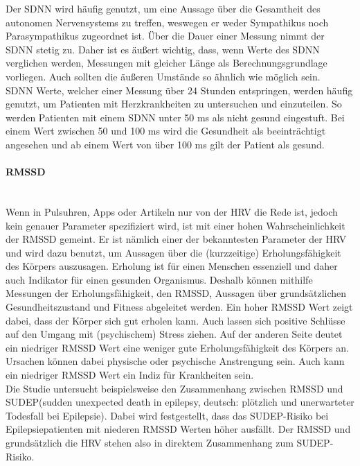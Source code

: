 Der \acs{SDNN} wird häufig genutzt, um eine Aussage über die Gesamtheit des autonomen Nervensystems zu treffen, weswegen er weder Sympathikus noch Parasympathikus zugeordnet ist.\cite[S.22]{babilon}  Über die Dauer einer Messung nimmt der \acs{SDNN} stetig zu. Daher ist es äußert wichtig, dass, wenn Werte des \acs{SDNN} verglichen werden, Messungen mit gleicher Länge als Berechnungsgrundlage vorliegen. Auch sollten die äußeren Umstände so ähnlich wie möglich sein.\cite{zeit}\\
\acs{SDNN} Werte, welcher einer Messung über 24 Stunden entspringen, werden häufig genutzt, um Patienten mit Herzkrankheiten zu untersuchen und einzuteilen. So werden Patienten mit einem \acs{SDNN} unter 50 ms als nicht gesund eingestuft. Bei einem Wert zwischen 50 und 100 ms wird die Gesundheit als beeinträchtigt angesehen und ab einem Wert von über 100 ms gilt der Patient als gesund. \cite[S.4]{med}  

\paragraph{\ac{RMSSD}}\mbox{} \\
Wenn in Pulsuhren, Apps oder Artikeln nur von der \acs{HRV} die Rede ist, jedoch kein genauer Parameter spezifiziert wird, ist mit einer hohen Wahrscheinlichkeit der \acs{RMSSD} gemeint. Er ist nämlich einer der bekanntesten Parameter der \acs{HRV} und wird dazu benutzt, um Aussagen über die (kurzzeitige) Erholungsfähigkeit des Körpers auszusagen. Erholung ist für einen Menschen essenziell und daher auch Indikator für einen gesunden Organismus. Deshalb können mithilfe Messungen der Erholungsfähigkeit, den \acs{RMSSD}, Aussagen über grundsätzlichen Gesundheitszustand und Fitness abgeleitet werden.
Ein hoher \acs{RMSSD} Wert zeigt dabei, dass der Körper sich gut erholen kann. Auch lassen sich positive Schlüsse auf den Umgang mit (psychischem) Stress ziehen. 
Auf der anderen Seite deutet ein niedriger \acs{RMSSD} Wert eine weniger gute Erholungsfähigkeit des Körpers an. Ursachen können dabei physische oder psychische Anstrengung sein. Auch kann ein niedriger \acs{RMSSD} Wert ein Indiz für Krankheiten sein.\\
 Die Studie \cite{sudep} untersucht beispielsweise den Zusammenhang zwischen \acs{RMSSD} und \acs{SUDEP}(sudden unexpected death in epilepsy, deutsch: plötzlich und unerwarteter Todesfall bei Epilepsie). Dabei wird festgestellt, dass das \acs{SUDEP}-Risiko bei Epilepsiepatienten mit niederen \acs{RMSSD} Werten höher ausfällt. Der \acs{RMSSD} und grundsätzlich die \acs{HRV} stehen also in direktem Zusammenhang zum \acs{SUDEP}-Risiko. 

